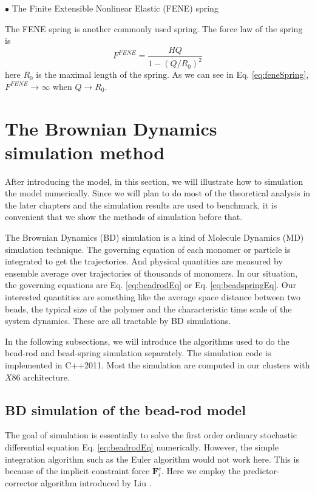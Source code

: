 $\bullet$ The Finite Extensible Nonlinear Elastic (FENE) spring

The FENE spring is another commonly used spring. The force law of the spring is
\begin{equation}
    \label{eq:feneSpring}
    F^{FENE} = \frac{H Q}{1-(Q/R_0)^2}
\end{equation}
here $R_0$ is the maximal length of the spring. As we can see in Eq. \eqref{eq:feneSpring}, $F^{FENE}\rightarrow\infty$ when $Q\rightarrow R_0$. 





\section{The Brownian Dynamics simulation method}
\label{sec:the_brownian_dynamics_simulation_method}
After introducing the model, in this section, we will illustrate how to simulation the model numerically. Since we will plan to do most of the theoretical analysis in the later chapters and the simulation results are used to benchmark, it is convenient that we show the methods of simulation before that. 

The Brownian Dynamics (BD) simulation is a kind of Molecule Dynamics (MD) simulation technique. The governing equation of each monomer or particle is integrated to get the trajectories. And physical quantities are measured by ensemble average over trajectories of thousands of monomers. In our situation, the governing equations are Eq. \eqref{eq:beadrodEq} or Eq. \eqref{eq:beadspringEq}. Our interested quantities are something like the average space distance between two beads, the typical size of the polymer and the characteristic time scale of the system dynamics. These are all tractable by BD simulations. 

In the following subsections, we will introduce the algorithms used to do the bead-rod and bead-spring simulation separately. The simulation code is implemented in C++2011. Most the simulation are computed in our clusters with $X86$ architecture.

\subsection{BD simulation of the bead-rod model}
\label{sub:bd_of_bead_rod_model}

The goal of simulation is essentially to solve the first order ordinary stochastic differential equation Eq. \eqref{eq:beadrodEq} numerically. However, the simple integration algorithm such as the Euler algorithm would not work here. This is because of the implicit constraint force $\mathbf{F}_i^{c}$. Here we employ the predictor-corrector algorithm introduced by Liu \cite{Liu1989}. 

